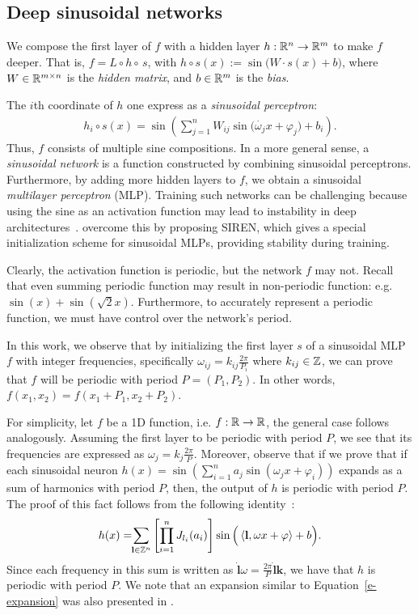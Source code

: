 \subsection{Deep sinusoidal networks}\label{s-deep-networks}

We compose the first layer of $f$ with a hidden layer $h:\mathbb{R}^{n}\to \mathbb{R}^{m}$ to make $f$ deeper.
That is,
$f=L\circ h \circ \,s$, 
with $h\circ s(x):=\sin\big(W \cdot s(x)+b\big)$, where $W\in\mathbb{R}^{m\times n}$ is the \textit{hidden matrix}, and $b\in\mathbb{R}^{m}$ is the \textit{bias}.


\noindent The $i$th coordinate of $h$ one express as a \textit{sinusoidal perceptron}:
%
\begin{align*}
h_{i}\circ s(x)=\sin\left(\sum_{j=1}^{n} W_{ij} \sin\Big(\dot{\omega_j}{x}+\varphi_j\Big) + b_{i}\right).
\end{align*}
%
Thus, $f$ consists of multiple sine compositions. In a more general sense, a \textit{sinusoidal network} is a function constructed by combining sinusoidal perceptrons.
Furthermore, by adding more hidden layers to $f$, we obtain a sinusoidal \textit{multilayer perceptron} (MLP). Training such networks can be challenging because using the sine as an activation function may lead to instability in deep architectures~\cite{taming2017}. \citet{sitzmann2019siren} overcome this by proposing SIREN, which gives a special initialization scheme for sinusoidal MLPs, providing stability during training.

Clearly, the activation function is periodic, but the network $f$ may not.
Recall that even summing periodic function may result in non-periodic function: e.g. $\sin(x)+\sin\left(\sqrt{2}x\right)$. 
Furthermore, to accurately represent a periodic function, we must have control over the network's period.

In this work, we observe that by initializing the first layer $s$ of a sinusoidal MLP $f$ with integer frequencies, specifically $\omega_{ij}=k_{ij}\frac{2\pi}{P_i}$ where $k_{ij}\in\mathbb{Z}$, we can prove that $f$ will be periodic with period $P=(P_1,P_{2})$.
In other words, $f(x_1, x_2)=f(x_1+P_1, x_2+P_2)$.

For simplicity, let $f$ be a 1D function, i.e. $f:\mathbb{R}\to\mathbb{R}$, the general case follows analogously. 
Assuming the first layer to be periodic with period $P$, we see that its frequencies are expressed as $\omega_j=k_{j}\frac{2\pi}{P}$. 
Moreover, observe that if we prove that if each sinusoidal neuron $h(x)=\sin\left(\sum_{i=1}^n a_j\sin(\omega_j x + \varphi_i)\right)$ expands as a sum of harmonics with period $P$, then, the output of $h$ is periodic with period $P$. The proof of this fact follows from the following identity~\cite{novello2022understanding}:
\begin{align}\label{e-expansion}
    h(x)= \!\!\sum_{\textbf{l}\in\mathbb{Z}^n}\left[\prod_{i=1}^n J_{l_i}(a_i)\right]\sin\Big(\left\langle\textbf{l},\omega x +\varphi\right\rangle+ b\Big).
\end{align}
Since each frequency in this sum is written as $\dot{\textbf{l}}{\omega}=\frac{2\pi}{P}\dot{\textbf{l}}{\textbf{k}}$, we have that $h$ is periodic with period $P$.
We note that an expansion similar to Equation~\ref{e-expansion} was also presented in \cite{yuce2022structured}.


